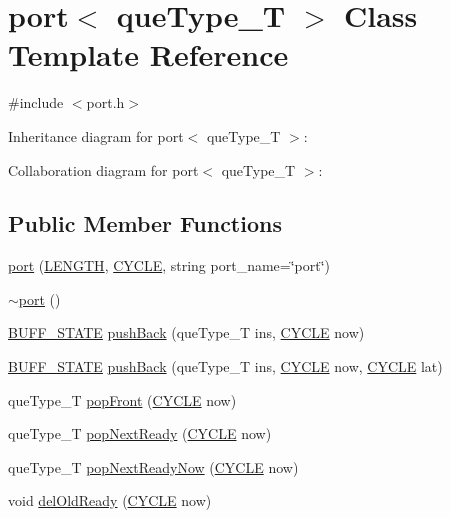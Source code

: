\hypertarget{classport}{
\section{port$<$ queType\_\-T $>$ Class Template Reference}
\label{classport}
}


{\ttfamily \#include $<$port.h$>$}



Inheritance diagram for port$<$ queType\_\-T $>$:


Collaboration diagram for port$<$ queType\_\-T $>$:
\subsection*{Public Member Functions}
\begin{DoxyCompactItemize}
\item 
\hyperlink{classport_aa397f17dedc41b12c65d9cfce47d5f5c}{port} (\hyperlink{global_2global_8h_ad7ec63c69447a2b630929c8e0197860d}{LENGTH}, \hyperlink{global_2global_8h_a7e19a550ec11d1ed921deb20c22efb5b}{CYCLE}, string port\_\-name=\char`\"{}port\char`\"{})
\item 
\hyperlink{classport_a51a6e901a1eac3a1c3fd35a140fecbfb}{$\sim$port} ()
\item 
\hyperlink{global_2global_8h_a8bd4ea2582a6025c1cfe99bf9947489c}{BUFF\_\-STATE} \hyperlink{classport_a52ad1c5223f028930491b024f26467fa}{pushBack} (queType\_\-T ins, \hyperlink{global_2global_8h_a7e19a550ec11d1ed921deb20c22efb5b}{CYCLE} now)
\item 
\hyperlink{global_2global_8h_a8bd4ea2582a6025c1cfe99bf9947489c}{BUFF\_\-STATE} \hyperlink{classport_a7c709a92ed8525cf8a310b294e606267}{pushBack} (queType\_\-T ins, \hyperlink{global_2global_8h_a7e19a550ec11d1ed921deb20c22efb5b}{CYCLE} now, \hyperlink{global_2global_8h_a7e19a550ec11d1ed921deb20c22efb5b}{CYCLE} lat)
\item 
queType\_\-T \hyperlink{classport_a95bf81afb2a6c03ac2272b3708322b74}{popFront} (\hyperlink{global_2global_8h_a7e19a550ec11d1ed921deb20c22efb5b}{CYCLE} now)
\item 
queType\_\-T \hyperlink{classport_acf2f0e0dfd7a375c2c87780d4eaacc99}{popNextReady} (\hyperlink{global_2global_8h_a7e19a550ec11d1ed921deb20c22efb5b}{CYCLE} now)
\item 
queType\_\-T \hyperlink{classport_ac1c1b53525c4c69eba7c28e59275e45f}{popNextReadyNow} (\hyperlink{global_2global_8h_a7e19a550ec11d1ed921deb20c22efb5b}{CYCLE} now)
\item 
void \hyperlink{classport_aec1749eb1d434806670ba00b669bad78}{delOldReady} (\hyperlink{global_2global_8h_a7e19a550ec11d1ed921deb20c22efb5b}{CYCLE} now)

\end{DoxyCompactItemize}
